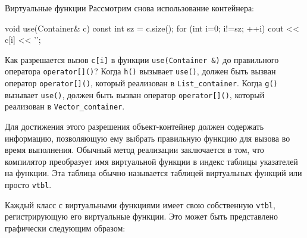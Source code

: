\documentclass[
    8pt,
    hyperref={pdfencoding=unicode}
    ]{beamer}
\theoremstyle{definition}
\begin{document}
\begin{frame}{Виртуальные функции}
    Рассмотрим снова использование контейнера:
    \begin{cppcode}
        void use(Container& c)
        {
            const int sz = c.size();
            for (int i=0; i!=sz; ++i)
                cout << c[i] << '\n';
        }
    \end{cppcode}
    Как разрешается вызов \texttt{c[i]} в функции \texttt{use(Container &)} до правильного оператора 
    \texttt{operator[]()}? Когда \texttt{h()}  вызывает \texttt{use()}, должен быть вызван оператор 
    \texttt{operator[]()}, который реализован в \texttt{List_container}. Когда \texttt{g()}  вызывает 
    \texttt{use()}, должен быть вызван оператор \texttt{operator[]()}, который реализован в 
    \texttt{Vector_container}.   
    
    \vspace{4mm}
     
    Для достижения этого разрешения объект-контейнер должен содержать информацию, позволяющую ему выбрать правильную функцию для вызова 
    во время выполнения. Обычный метод реализации заключается в том, что компилятор преобразует имя виртуальной функции в индекс таблицы 
    указателей на функции. Эта таблица обычно называется таблицей виртуальных функций или просто \texttt{vtbl}.
    
    \vspace{4mm}
    
    Каждый класс с виртуальными функциями имеет свою собственную \texttt{vtbl}, регистрирующую его виртуальные функции. Это может быть представлено графически следующим образом:
    
    \begin{figure}
        \small
\end{figure}
\end{frame}
\end{document}
